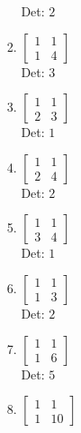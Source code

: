 \documentclass[12pt]{article}
\begin{document}
\begin{enumerate}
\begin{enumerate}
\begin{enumerate}
Det: $2$\\


\item $\displaystyle \left[\begin{matrix}1 & 1\\1 & 4\end{matrix}\right]$\\

Det: $3$\\


\item $\displaystyle \left[\begin{matrix}1 & 1\\2 & 3\end{matrix}\right]$\\

Det: $1$\\


\item $\displaystyle \left[\begin{matrix}1 & 1\\2 & 4\end{matrix}\right]$\\

Det: $2$\\


\item $\displaystyle \left[\begin{matrix}1 & 1\\3 & 4\end{matrix}\right]$\\

Det: $1$\\


\item $\displaystyle \left[\begin{matrix}1 & 1\\1 & 3\end{matrix}\right]$\\

Det: $2$\\


\item $\displaystyle \left[\begin{matrix}1 & 1\\1 & 6\end{matrix}\right]$\\

Det: $5$\\


\item $\displaystyle \left[\begin{matrix}1 & 1\\1 & 10\end{matrix}\right]$\\


\end{enumerate}
\end{enumerate}
\end{enumerate}
\end{document}
